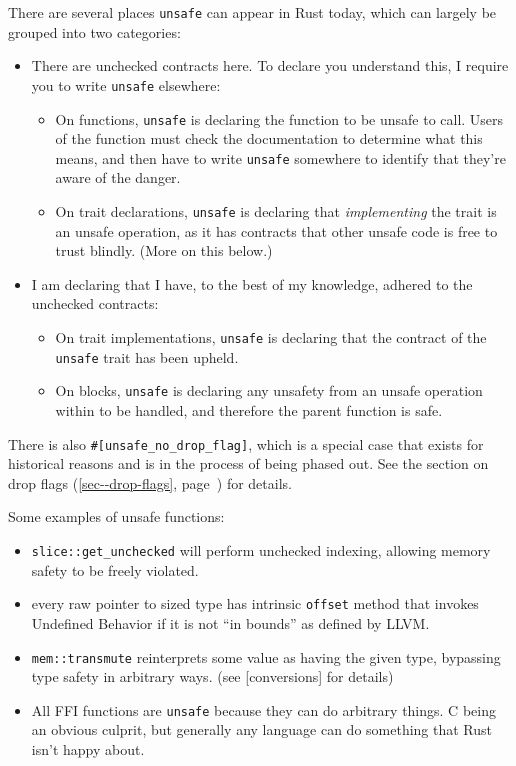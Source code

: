 \documentclass[a4paper,]{book}
\renewcommand*{\hyperlink}[2]{%
 #2 (\autoref{#1}, page~\pageref{#1})}
\providecommand{\tightlist}{%
  \setlength{\itemsep}{0pt}\setlength{\parskip}{0pt}}
\begin{document}
There are several places \texttt{unsafe} can appear in Rust today, which
can largely be grouped into two categories:

\begin{itemize}
\tightlist
\item
  There are unchecked contracts here. To declare you understand this, I
  require you to write \texttt{unsafe} elsewhere:

  \begin{itemize}
  \tightlist
  \item
    On functions, \texttt{unsafe} is declaring the function to be unsafe
    to call. Users of the function must check the documentation to
    determine what this means, and then have to write \texttt{unsafe}
    somewhere to identify that they're aware of the danger.
  \item
    On trait declarations, \texttt{unsafe} is declaring that
    \emph{implementing} the trait is an unsafe operation, as it has
    contracts that other unsafe code is free to trust blindly. (More on
    this below.)
  \end{itemize}
\item
  I am declaring that I have, to the best of my knowledge, adhered to
  the unchecked contracts:

  \begin{itemize}
  \tightlist
  \item
    On trait implementations, \texttt{unsafe} is declaring that the
    contract of the \texttt{unsafe} trait has been upheld.
  \item
    On blocks, \texttt{unsafe} is declaring any unsafety from an unsafe
    operation within to be handled, and therefore the parent function is
    safe.
  \end{itemize}
\end{itemize}

There is also \texttt{\#{[}unsafe\_no\_drop\_flag{]}}, which is a
special case that exists for historical reasons and is in the process of
being phased out. See the section on
\protect\hyperlink{sec--drop-flags}{drop flags} for details.

Some examples of unsafe functions:

\begin{itemize}
\tightlist
\item
  \texttt{slice::get\_unchecked} will perform unchecked indexing,
  allowing memory safety to be freely violated.
\item
  every raw pointer to sized type has intrinsic \texttt{offset} method
  that invokes Undefined Behavior if it is not ``in bounds'' as defined
  by LLVM.
\item
  \texttt{mem::transmute} reinterprets some value as having the given
  type, bypassing type safety in arbitrary ways. (see {[}conversions{]}
  for details)
\item
  All FFI functions are \texttt{unsafe} because they can do arbitrary
  things. C being an obvious culprit, but generally any language can do
  something that Rust isn't happy about.
\end{itemize}
\end{document}
